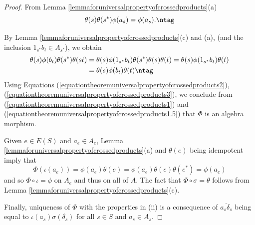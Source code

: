 \begin{proof}
From Lemma \ref{lemmaforuniversalpropertyofcrossedproducts}(a)
\[\theta(s)\theta(s^*)\phi(a_s)=\phi(a_s).\ntag\label{equationtheoremuniversalpropertyofcrossedproducts2}\]

By Lemma \ref{lemmaforuniversalpropertyofcrossedproducts}(c) and (a), (and the inclusion $1_{s^*}b_t\in A_{s^*}$), we obtain
\begin{align*}
\theta(s)\phi(b_t)\theta(s^*)\theta(st)&=\theta(s)\phi(1_{s^*}b_t)\theta(s^*)\theta(s)\theta(t)=\theta(s)\phi(1_{s^*}b_t)\theta(t)\\
&=\theta(s)\phi(b_t)\theta(t)\ntag\label{equationtheoremuniversalpropertyofcrossedproducts3}
\end{align*}
Using Equations (\ref{equationtheoremuniversalpropertyofcrossedproducts2}), (\ref{equationtheoremuniversalpropertyofcrossedproducts3}), we conclude from (\ref{equationtheoremuniversalpropertyofcrossedproducts1}) and (\ref{equationtheoremuniversalpropertyofcrossedproducts1.5}) that $\Phi$ is an algebra morphism.

Given $e\in E(S)$ and $a_e\in A_e$, Lemma \ref{lemmaforuniversalpropertyofcrossedproducts}(a) and $\theta(e)$ being idempotent imply that
\[\Phi(\iota(a_e))=\phi(a_e)\theta(e)=\phi(a_e)\theta(e)\theta(e^*)=\phi(a_e)\]
and so $\Phi\circ\iota=\phi$ on $A_e$ and thus on all of $A$. The fact that $\Phi\circ\sigma=\theta$ follows from Lemma \ref{lemmaforuniversalpropertyofcrossedproducts}(c).

Finally, uniqueness of $\Phi$ with the properties in (ii) is a consequence of $\overline{a_s\delta_s}$ being equal to $\iota(a_s)\sigma(\delta_s)$ for all $s\in S$ and $a_s\in A_s$.\qedhere
\end{proof}

%
%
%
